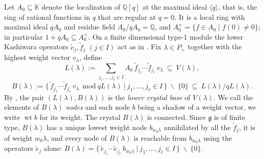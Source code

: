 \documentclass[12pt]{amsart}
\theoremstyle{plain}
\theoremstyle{remark}
\newcommand{\g}{\mathfrak{g}}
\newcommand{\wt}{\operatorname{wt}}
\newcommand{\K}{\mathbb{K}}
\begin{document}
Let $A_0\subseteq\K$ denote the localization of $\mathbb Q[q]$ at the maximal ideal
$\langle q\rangle$, that is, the ring of rational functions in $q$ that are regular at
$q=0$. It is a local ring with maximal ideal $qA_0$ and residue field
$A_0/qA_0=\mathbb Q$, and
$A_0^\times=\{f\in A_0\mid f(0)\neq0\}$; in particular $1+qA_0\subseteq A_0^\times$. On a finite dimensional type-$1$ module the lower Kashiwara operators $\tilde e_j,\tilde f_j$
$(j\in I)$ act as in \cite{Kashiwara}. Fix $\lambda\in P_+$ together with the highest weight
vector $v_\lambda$, define
\[
L(\lambda):= \sum_{j_1,\dots,j_\ell\in I}
A_0\,\tilde f_{j_1}\cdots\tilde f_{j_\ell}\,v_\lambda\ \subseteq\ V(\lambda),
\]
\[
B(\lambda):=\big\{\,\tilde f_{j_1}\cdots\tilde f_{j_\ell}\,v_\lambda
\ \ \mathrm{mod}\ qL(\lambda)\ \big|\ j_1,\dots,j_\ell\in I\,\big\}
\ \smallsetminus\ \{0\}\ \subseteq\ L(\lambda)/qL(\lambda).
\]
By \cite{Kashiwara}, the pair $(L(\lambda),B(\lambda))$ is the \emph{lower crystal base}
of $V(\lambda)$. We call the elements of $B(\lambda)$
\emph{nodes} and each node $b$ being a shadow of a weight vector, we write $\wt b$ for its weight. The crystal $B(\lambda)$ is connected. Since $\g$ is of finite type, $B(\lambda)$
has a unique lowest weight node $b_{w_0\lambda}$ annihilated by all the $\tilde f_j$, it is of
weight $w_0\lambda$, and every node of $B(\lambda)$ is reachable from
$b_{w_0\lambda}$ using the operators $\tilde e_j$ alone: $B(\lambda)=\big\{\,\tilde e_{j_1}\cdots\tilde e_{j_\ell}\,b_{w_0\lambda}
\ \big|\ j_1,\dots,j_\ell\in I\,\big\}\ \smallsetminus\ \{0\}$.
\end{document}
